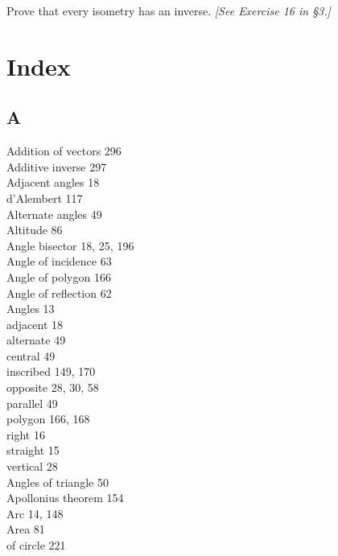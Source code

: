 \documentclass[12pt]{book} %
\begin{document}
\begin{ExerciseList}
\begin{ExerciseList}
\begin{ExerciseList}
\begin{ExerciseList}
\Exercise Prove that every isometry has an inverse. \textit{[See Exercise 16 in \S3.]}
\end{ExerciseList}

\chapter*{Index}

\section*{A}
Addition of vectors 296\\
Additive inverse 297\\
Adjacent angles 18\\
d'Alembert 117\\
Alternate angles 49\\
Altitude 86\\
Angle bisector 18, 25, 196\\
Angle of incidence 63\\
Angle of polygon 166\\
Angle of reflection 62\\
Angles 13\\
\hspace*{1em}adjacent 18\\
\hspace*{1em}alternate 49\\
\hspace*{1em}central 49\\
\hspace*{1em}inscribed 149, 170\\
\hspace*{1em}opposite 28, 30, 58\\
\hspace*{1em}parallel 49\\
\hspace*{1em}polygon 166, 168\\
\hspace*{1em}right 16\\
\hspace*{1em}straight 15\\
\hspace*{1em}vertical 28\\
Angles of triangle 50\\
Apollonius theorem 154\\
Arc 14, 148\\
Area 81\\
\hspace*{1em}of circle 221\\

\end{ExerciseList}
\end{ExerciseList}
\end{ExerciseList}
\end{document}
